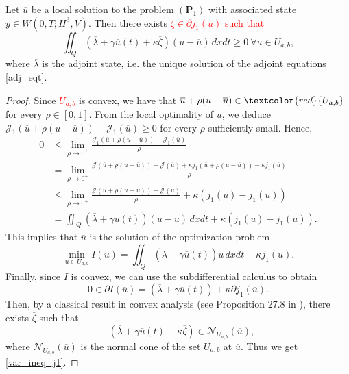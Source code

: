 \documentclass[reqno]{amsart}
\begin{document}
	\begin{theorem} \label{fnc_j1}
		Let $\overline{u}$ be a local solution to the problem $(\textbf{P}_1)$ with associated state $\overline{y} \in W(0,T;H^3,V)$. Then there exists \textcolor{red}{ $\overline{\zeta}\in \partial j_1(\overline{u})$ such that }
		\begin{equation} \label{var_ineq_j1}
			\iint_Q \left( \overline{\lambda} + \gamma \overline{u}(t)+ \kappa \overline{\zeta} \right)(u-\overline{u}) \,dxdt\geq 0 \ \forall u\in U_{a,b},
		\end{equation}
		where $\overline{\lambda}$ is the adjoint state, i.e. the unique solution of the adjoint equations \eqref{adj_eqt}.
	\end{theorem}
	\begin{proof}
		Since \textcolor{red}{$U_{a, b}$} is convex, we have that $\overline{u} + \rho (u - \overline{u}) \in \textcolor{red}{U_{a, b}}$ for every $\rho \in [0,1]$. From the local optimality of $\overline{u}$, we deduce $\mathcal{J}_1(\overline{u}+\rho(u - \overline{u})) - \mathcal{J}_1(\overline{u}) \geq 0$ for every $\rho$ sufficiently small. Hence,
		\begin{align*}
			0 &\leq \underset{\rho \rightarrow 0^+}{\lim} \frac{\mathcal{J}_1(\overline{u}+\rho (u - \overline{u})) - \mathcal{J}_1(\overline{u})}{\rho}\\
			&= \underset{\rho \rightarrow0^+}{\lim} \frac{\mathcal{J}(\overline{u}+\rho(u-\overline{u}))- \mathcal{J}(\overline{u})+\kappa j_1(\overline{u}+\rho(u-\overline{u})) - \kappa j_1(\overline{u}) }{\rho}\\
			&\leq \underset{\rho\rightarrow0^+}{\lim} \frac{\mathcal{J}(\overline{u}+\rho(u-\overline{u}))- \mathcal{J}(\overline{u})}{\rho} + \kappa (j_1(u) - j_1(\overline{u})) \\
			& =\iint_Q (\overline{\lambda} + \gamma \overline{u}(t))(u-\overline{u}) \, dxdt + \kappa (j_1(u)-j_1(\overline{u})).
		\end{align*}
		This implies that $\overline{u}$ is the solution of the optimization problem
		\begin{equation*}
			\underset{u\in U_{a, b}}{\min} I(u)= \iint_Q (\overline{\lambda}+\gamma \overline{u}(t))u \, dxdt + \kappa j_1(u).
		\end{equation*}
		Finally, since $I$ is convex, we can use the subdifferential calculus to obtain
		\begin{equation*}
			0 \in \partial I(\overline{u})=(\overline{\lambda} + \gamma \overline{u}(t)) + \kappa \partial j_1 (\overline{u}).
		\end{equation*}
		Then, by a classical result in convex analysis (see Proposition 27.8 in \cite{Bauschke2010}), there exists $\overline{\zeta}$ such that
		\begin{equation*}
			-(\overline{\lambda} + \gamma \overline{u}(t)+ \kappa \overline{\zeta}) \in \mathcal{N}_{U_{a,b}} (\overline{u}),
		\end{equation*}
		where $\mathcal{N}_{U_{a,b}}(\overline{u})$ is the normal cone of the set $U_{a,b}$ at $\overline{u}$. Thus we get \eqref{var_ineq_j1}.
	\end{proof}
\end{document}
